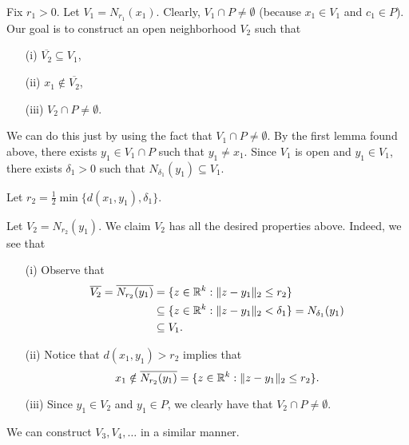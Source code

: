 \documentclass[a4paper]{report}
\begin{document}
\begin{remark}\label{Construction of neighborhoods}
   Fix \( {r}_{1} > 0  \). Let \( {V}_{1} = {N}_{{r}_{1}}({x}_{1})  \). Clearly, \( {V}_{1} \cap P \neq \emptyset \) (because \( {x}_{1} \in {V}_{1}  \) and \( {c}_{1} \in P \)). Our goal is to construct an open neighborhood \( {V}_{2} \) such that 
   \begin{enumerate}
       \item[(i)] \( \overline{{V}_{2}} \subseteq {V}_{1} \),
       \item[(ii)] \( {x}_{1} \notin \overline{{V}_{2}} \),
        \item[(iii)] \( {V}_{2} \cap P \neq \emptyset \).
   \end{enumerate}
   We can do this just by using the fact that \( {V}_{1} \cap P \neq \emptyset \). By the first lemma found above, there exists \( {y}_{1} \in {V}_{1} \cap P  \) such that \( {y}_{1} \neq {x}_{1} \). Since \( {V}_{1}  \) is open and \( {y}_{1} \in {V}_{1} \), there exists \( {\delta}_{1} > 0  \) such that \( {N}_{{\delta}_{1}} ({y}_{1}) \subseteq  {V}_{1} \). 
   \begin{center}
        Let \( {r}_{2} = \frac{ 1 }{ 2 }  \min \{ d({x}_{1}, {y}_{1}), {\delta}_{1} \}.  \) 
   \end{center}
   Let \( {V}_{2} = {N}_{{r}_{2}}({y}_{1}) \). We claim \( {V}_{2} \) has all the desired properties above. Indeed, we see that 
   \begin{enumerate}
       \item[(i)] Observe that \begin{align*}
           \overline{{V}_{2}} = \overline{{N}_{{r}_{2}}({y}_{1})} &= \{ z \in \mathbb{R}^{k} : \| z - {y}_{1}\|_2 \leq {r}_{2} \} \\
                                                                  &\subseteq \{ z \in \mathbb{R}^{k} : \|z - {y}_{1}\|_2 < {\delta}_{1} \} = {N}_{{\delta}_{1}}({y}_{1}) \\ 
                                                                  &\subseteq {V}_{1}.
       \end{align*}
    \item[(ii)] Notice that \( d({x}_{1}, {y}_{1}) > {r}_{2} \) implies that 
        \[  {x}_{1} \notin \overline{{N}_{{r}_{2}}({y}_{1})} = \{ z \in \mathbb{R}^{k} : \| z - {y}_{1} \|_2 \leq {r}_{2} \}.  \]
    \item[(iii)] Since \( {y}_{1} \in {V}_{2}  \) and \( {y}_{1} \in P  \), we clearly have that \( {V}_{2} \cap P  \neq \emptyset \).
   \end{enumerate}
   We can construct \( {V}_{3}, {V}_{4}, \dots \) in a similar manner.
\end{remark}
\end{document}
